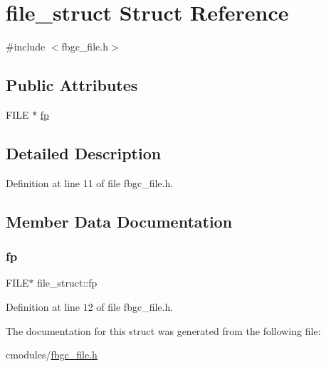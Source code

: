 \hypertarget{structfile__struct}{}\section{file\+\_\+struct Struct Reference}
\label{structfile__struct}


{\ttfamily \#include $<$fbgc\+\_\+file.\+h$>$}

\subsection*{Public Attributes}
\begin{DoxyCompactItemize}
\item 
F\+I\+LE $\ast$ \hyperlink{structfile__struct_ac23cded34e74305131027c4d092838e9}{fp}
\end{DoxyCompactItemize}


\subsection{Detailed Description}


Definition at line 11 of file fbgc\+\_\+file.\+h.



\subsection{Member Data Documentation}
\mbox{\label{structfile__struct_ac23cded34e74305131027c4d092838e9}} 
\subsubsection{\texorpdfstring{fp}{fp}}
{\footnotesize\ttfamily F\+I\+LE$\ast$ file\+\_\+struct\+::fp}



Definition at line 12 of file fbgc\+\_\+file.\+h.



The documentation for this struct was generated from the following file\+:\begin{DoxyCompactItemize}
\item 
cmodules/\hyperlink{fbgc__file_8h}{fbgc\+\_\+file.\+h}\end{DoxyCompactItemize}
